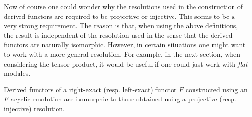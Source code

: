 	Now of course one could wonder why the resolutions used in the construction of derived functors are required to be projective or injective. This seems to be a very strong requirement. The reason is that, when using the above definitions, the result is independent of the resolution used in the sense that the derived functors are naturally isomorphic. However, in certain situations one might want to work with a more general resolution. For example, in the next section, when considering the tensor product, it would be useful if one could just work with \textit{flat} modules.
    \begin{property}\label{homalg:acyclic_derived_functors}
        Derived functors of a right-exact (resp. left-exact) functor $F$ constructed using an $F$-acyclic resolution are isomorphic to those obtained using a projective (resp. injective) resolution.
    \end{property}

